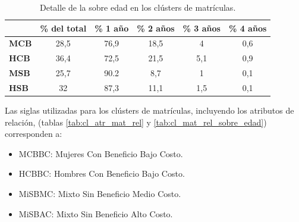 \begin{table}[H]
\centering
\caption{Detalle de la sobre edad en los clústers de matrículas.}
\label{tab:cl_mat_sobre_edad}
\begin{tabular}{|l|c|c|c|c|c|}
\hline
             & \textbf{\% del total} & \textbf{\% 1 año\footnotemark} & \textbf{\% 2 años\footnotemark[\value{footnote}]} & \textbf{\% 3 años\footnotemark[\value{footnote}]} & \textbf{\% 4 años\footnotemark[\value{footnote}]} \\ \hline
\textbf{MCB} & 28,5                  & 76,9              & 18,5               & 4                  & 0,6                \\ \hline
\textbf{HCB} & 36,4                  & 72,5              & 21,5               & 5,1                & 0,9                \\ \hline
\textbf{MSB} & 25,7                  & 90.2              & 8,7                & 1                  & 0,1                \\ \hline
\textbf{HSB} & 32                    & 87,3              & 11,1               & 1,5                & 0,1                \\ \hline
\end{tabular}
\end{table}


Las siglas utilizadas para los clústers de matrículas, incluyendo los atributos de relación, (tablas \ref{tab:cl_atr_mat_rel} y \ref{tab:cl_mat_rel_sobre_edad}) corresponden a:

\begin{itemize}
    \item MCBBC: Mujeres Con Beneficio Bajo Costo.
    \item HCBBC: Hombres Con Beneficio Bajo Costo.
    \item MiSBMC: Mixto Sin Beneficio Medio Costo.
    \item MiSBAC: Mixto Sin Beneficio Alto Costo.
\end{itemize}

